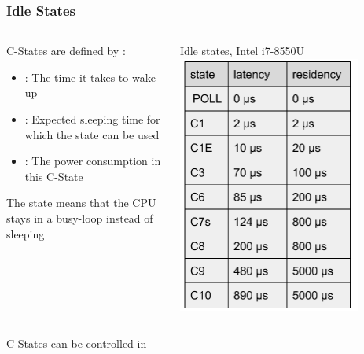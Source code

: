 \begin{frame}
	\frametitle{Idle States}
	\begin{columns}
		\begin{column}{0.7\textwidth}
			C-States are defined by :
			\begin{itemize}
				\item {} : The time it takes to wake-up
				\item {} : Expected sleeping time for which the state can be used
				\item {} : The power consumption in this C-State
			\end{itemize}
			The  state means that the CPU stays in a busy-loop instead of sleeping
		\end{column}
		\begin{column}{0.3\textwidth}
			Idle states, Intel i7-8550U
		    \includegraphics[width=0.8\textwidth]{slides/realtime-linux-hardware/cpu_idle_states_example}
		\end{column}
	\end{columns}
	\vspace{0.5cm}
C-States can be controlled in 
\end{frame}

